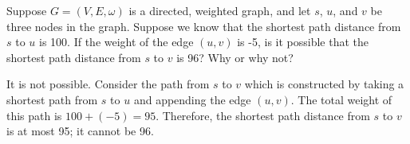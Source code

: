 \begin{prob}[\eligible]
    Suppose $G = (V, E, \omega)$ is a directed, weighted graph, and let $s$, $u$,
    and $v$ be three nodes in the graph. Suppose we know that the shortest path distance
    from $s$ to $u$ is 100. If the weight of the edge $(u, v)$ is -5, is it possible that the
    shortest path distance from $s$ to $v$ is 96? Why or why not?

    \begin{soln}
        It is not possible. Consider the path from $s$ to $v$ which is constructed by taking
        a shortest path from $s$ to $u$ and appending the edge $(u, v)$. The total weight
        of this path is $100 + (-5) = 95$. Therefore, the shortest path distance from $s$
        to $v$ is at most 95; it cannot be 96.
    \end{soln}
\end{prob}
